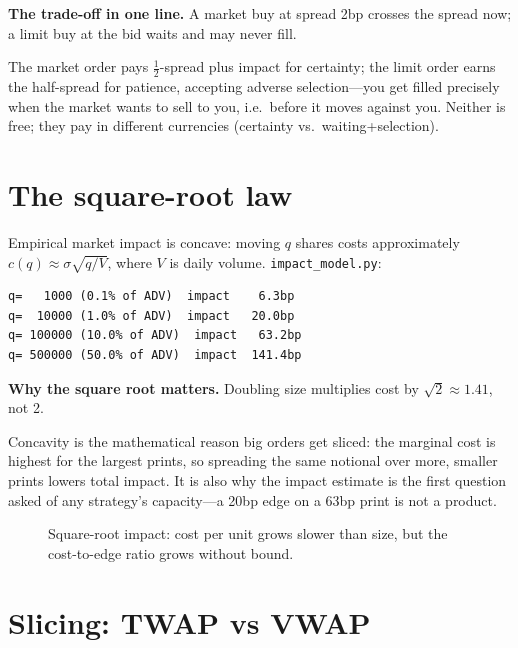 \begin{example}\label{ex:mktlim}
\textbf{The trade-off in one line.} A market buy at spread 2bp crosses the spread now;
a limit buy at the bid waits and may never fill.
\begin{solution}
The market order pays $\frac{1}{2}$-spread plus impact for certainty; the limit order
earns the half-spread for patience, accepting adverse selection---you get filled
precisely when the market wants to sell to you, i.e.\ before it moves against you.
Neither is free; they pay in different currencies (certainty vs.\ waiting+selection).
\end{solution}
\end{example}

\section{The square-root law}\label{sec:sqrtlaw}

Empirical market impact is concave: moving $q$ shares costs approximately
$c(q)\approx\sigma\sqrt{q/V}$, where $V$ is daily volume. \texttt{impact\_model.py}:
\begin{lstlisting}[numbers=none]
q=   1000 (0.1% of ADV)  impact    6.3bp
q=  10000 (1.0% of ADV)  impact   20.0bp
q= 100000 (10.0% of ADV)  impact   63.2bp
q= 500000 (50.0% of ADV)  impact  141.4bp
\end{lstlisting}

\begin{example}\label{ex:sqrt}
\textbf{Why the square root matters.} Doubling size multiplies cost by $\sqrt2\approx1.41$,
not 2.
\begin{solution}
Concavity is the mathematical reason big orders get sliced: the marginal cost is highest
for the largest prints, so spreading the same notional over more, smaller prints lowers
total impact. It is also why the impact estimate is the first question asked of any
strategy's capacity---a 20bp edge on a 63bp print is not a product.
\end{solution}
\end{example}

\begin{figure}[htbp]\centering

\caption{Square-root impact: cost per unit grows slower than size, but the cost-to-edge
ratio grows without bound.}
\label{fig:impact10}
\end{figure}

\section{Slicing: TWAP vs VWAP}\label{sec:slicing}

